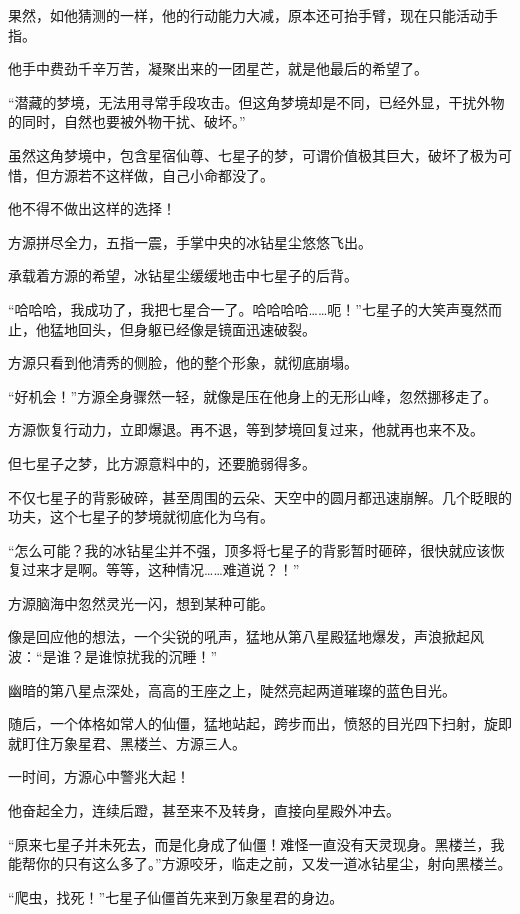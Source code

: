 \begin{this_body}
果然，如他猜测的一样，他的行动能力大减，原本还可抬手臂，现在只能活动手指。

他手中费劲千辛万苦，凝聚出来的一团星芒，就是他最后的希望了。

“潜藏的梦境，无法用寻常手段攻击。但这角梦境却是不同，已经外显，干扰外物的同时，自然也要被外物干扰、破坏。”

虽然这角梦境中，包含星宿仙尊、七星子的梦，可谓价值极其巨大，破坏了极为可惜，但方源若不这样做，自己小命都没了。

他不得不做出这样的选择！

方源拼尽全力，五指一震，手掌中央的冰钻星尘悠悠飞出。

承载着方源的希望，冰钻星尘缓缓地击中七星子的后背。

“哈哈哈，我成功了，我把七星合一了。哈哈哈哈……呃！”七星子的大笑声戛然而止，他猛地回头，但身躯已经像是镜面迅速破裂。

方源只看到他清秀的侧脸，他的整个形象，就彻底崩塌。

“好机会！”方源全身骤然一轻，就像是压在他身上的无形山峰，忽然挪移走了。

方源恢复行动力，立即爆退。再不退，等到梦境回复过来，他就再也来不及。

但七星子之梦，比方源意料中的，还要脆弱得多。

不仅七星子的背影破碎，甚至周围的云朵、天空中的圆月都迅速崩解。几个眨眼的功夫，这个七星子的梦境就彻底化为乌有。

“怎么可能？我的冰钻星尘并不强，顶多将七星子的背影暂时砸碎，很快就应该恢复过来才是啊。等等，这种情况……难道说？！”

方源脑海中忽然灵光一闪，想到某种可能。

像是回应他的想法，一个尖锐的吼声，猛地从第八星殿猛地爆发，声浪掀起风波：“是谁？是谁惊扰我的沉睡！”

幽暗的第八星点深处，高高的王座之上，陡然亮起两道璀璨的蓝色目光。

随后，一个体格如常人的仙僵，猛地站起，跨步而出，愤怒的目光四下扫射，旋即就盯住万象星君、黑楼兰、方源三人。

一时间，方源心中警兆大起！

他奋起全力，连续后蹬，甚至来不及转身，直接向星殿外冲去。

“原来七星子并未死去，而是化身成了仙僵！难怪一直没有天灵现身。黑楼兰，我能帮你的只有这么多了。”方源咬牙，临走之前，又发一道冰钻星尘，射向黑楼兰。

“爬虫，找死！”七星子仙僵首先来到万象星君的身边。


\end{this_body}
